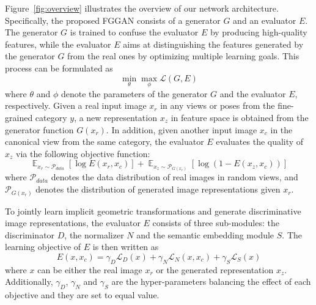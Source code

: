 \documentclass[runningheads]{llncs}
\begin{document}
Figure~\ref{fig:overview} illustrates the overview of our network architecture. 
Specifically, the proposed FGGAN consists of a generator $G$ and an evaluator $E$. 
The generator $G$ is trained to confuse the evaluator $E$ by producing high-quality features, while the evaluator $E$ aims at distinguishing the features generated by the generator $G$ from the real ones by optimizing multiple learning goals. This process can be formulated as
\begin{equation}
    \min_{\theta} \max_{\phi} \mathcal{L}(G, E)
    \label{eq:gan_form}
\end{equation}
where $\theta$ and $\phi$ denote the parameters of the generator $G$ and the evaluator $E$, respectively.
Given a real input image $x_r$ in any views or poses from the fine-grained category $y$, a new representation $x_z$ in feature space is obtained from the generator function $G(x_r)$.
In addition, given another input image $x_c$ in the canonical view from the same category, the evaluator $E$ evaluates the quality of $x_z$ via the following objective function:
\begin{equation}
    \mathop{\mathbb{E}}_{x_r \sim \mathcal{P}_{data}}\left[ \log E(x_r, x_c) \right] + \mathop{\mathbb{E}}_{x_z \sim \mathcal{P}_{G(x_r)}} \left[\log(1-E(x_z,x_c)) \right]
    \label{eq:e_loss}
\end{equation}
where $\mathcal{P}_{data}$ denotes the data distribution of real images in random views, and $\mathcal{P}_{G(x_r)}$ denotes the distribution of generated image representations given $x_r$.


To jointly learn implicit geometric transformations and generate discriminative image representations, the evaluator $E$ consists of three sub-modules: the discriminator $D$, the normalizer $N$ and the semantic embedding module $S$. 
The learning objective of $E$ is then written as
\begin{equation}
    E(x, x_c) = \gamma_D \mathcal{L}_D(x)+\gamma_N \mathcal{L}_N(x, x_c)+ \gamma_S\mathcal{L}_S(x)
    \label{eq:evaluator}
\end{equation}
where $x$ can be either the real image $x_r$ or the generated representation $x_z$. Additionally, $\gamma_D$, $\gamma_N$ and $\gamma_S$ are the hyper-parameters balancing the effect of each objective and they are set to equal value.
\end{document}
